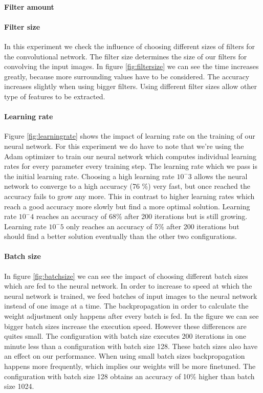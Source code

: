 \documentclass{article}
\begin{document}
\paragraph{Filter amount}
\paragraph{Filter size}
In this experiment we check the influence of choosing different sizes of filters for the convolutional network. The filter size determines the size of our filters for convolving the input images. In figure \ref{fig:filtersize} we can see the time increases greatly, because more surrounding values have to be considered. The accuracy increases slightly when using bigger filters. Using different filter sizes allow other type of features to be extracted. 
\paragraph{Learning rate}
Figure \ref{fig:learningrate} shows the impact of learning rate on the training of our neural network. 
For this experiment we do have to note that we're using the Adam optimizer to train our neural network which computes individual learning rates for every parameter every training step. The learning rate which we pass is the initial learning rate. Choosing a high learning rate $10^-3$ allows the neural network to converge to a high accuracy (76 \%) very fast, but once reached the accuracy fails to grow any more.
This in contrast to higher learning rates which reach a good accuracy more slowly but find a more optimal solution. Learning rate $10^-4$ reaches an accuracy of 68\% after 200 iterations but is still growing. Learning rate $10^-5$ only reaches an accuracy of 5\% after 200 iterations but should find a better solution eventually than the other two configurations. 
\paragraph{Batch size}
In figure \ref{fig:batchsize} we can see the impact of choosing different batch sizes which are fed to the neural network. In order to increase to speed at which the neural network is trained, we feed batches of input images to the neural network instead of one image at a time. The backpropagation in order to calculate the weight adjustment only happens after every batch is fed. In the figure we can see bigger batch sizes increase the execution speed. However these differences are quites small. The configuration with batch size executes 200 iterations in one minute less than a configuration with batch size 128. These batch sizes also have an effect on our performance. When using small batch sizes backpropagation happens more frequently, which implies our weights will be more finetuned. The configuration with batch size 128 obtains an accuracy of 10\% higher than batch size 1024.
\end{document}
